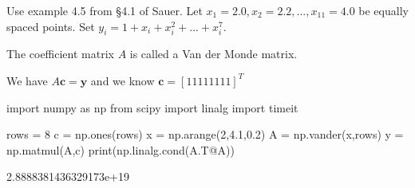 \documentclass[12pt,letterpaper,noanswers]{exam}
\begin{document}
Use example 4.5 from \S 4.1 of Sauer.  Let $x_1 = 2.0, x_2 = 2.2, ..., x_{11} = 4.0$ be equally spaced points.  Set $y_i = 1+x_i + x_i^2+...+x_i^7$.

The coefficient matrix $A$ is called a Van der Monde matrix.

We have $A\mathbf{c} = \mathbf{y}$ and we know $\mathbf{c} = [1 1 1 1 1 1 1 1]^T$

\begin{pyin}
import numpy as np
from scipy import linalg
import timeit
\end{pyin}

\begin{pyin}
rows = 8
c = np.ones(rows)
x = np.arange(2,4.1,0.2)
A = np.vander(x,rows)
y = np.matmul(A,c)
print(np.linalg.cond(A.T@A))
\end{pyin}

\begin{pyout}
2.8888381436329173e+19
\end{pyout}
\end{document}
